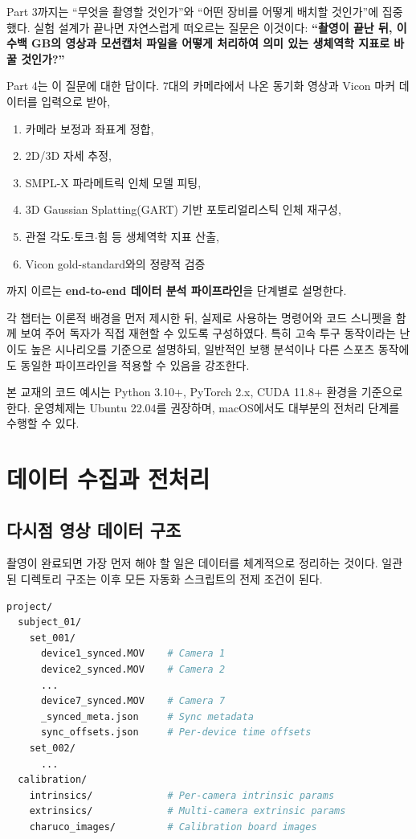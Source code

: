 \documentclass[11pt, a4paper]{report}
\begin{document}
Part 3까지는 ``무엇을 촬영할 것인가''와 ``어떤 장비를 어떻게 배치할 것인가''에 집중했다.
실험 설계가 끝나면 자연스럽게 떠오르는 질문은 이것이다:
\textbf{``촬영이 끝난 뒤, 이 수백 GB의 영상과 모션캡처 파일을 어떻게 처리하여 의미 있는 생체역학 지표로 바꿀 것인가?''}

Part 4는 이 질문에 대한 답이다. 7대의 카메라에서 나온 동기화 영상과 Vicon 마커 데이터를 입력으로 받아,
\begin{enumerate}[nosep]
  \item 카메라 보정과 좌표계 정합,
  \item 2D/3D 자세 추정,
  \item SMPL-X 파라메트릭 인체 모델 피팅,
  \item 3D Gaussian Splatting(GART) 기반 포토리얼리스틱 인체 재구성,
  \item 관절 각도$\cdot$토크$\cdot$힘 등 생체역학 지표 산출,
  \item Vicon gold-standard와의 정량적 검증
\end{enumerate}
까지 이르는 \textbf{end-to-end 데이터 분석 파이프라인}을 단계별로 설명한다.

각 챕터는 이론적 배경을 먼저 제시한 뒤, 실제로 사용하는 명령어와 코드 스니펫을 함께 보여 주어
독자가 직접 재현할 수 있도록 구성하였다. 특히 고속 투구 동작이라는 난이도 높은 시나리오를 기준으로 설명하되,
일반적인 보행 분석이나 다른 스포츠 동작에도 동일한 파이프라인을 적용할 수 있음을 강조한다.

\begin{importantnote}
본 교재의 코드 예시는 Python 3.10+, PyTorch 2.x, CUDA 11.8+ 환경을 기준으로 한다.
운영체제는 Ubuntu 22.04를 권장하며, macOS에서도 대부분의 전처리 단계를 수행할 수 있다.
\end{importantnote}

\newpage

\chapter{데이터 수집과 전처리}

\section{다시점 영상 데이터 구조}

촬영이 완료되면 가장 먼저 해야 할 일은 데이터를 체계적으로 정리하는 것이다.
일관된 디렉토리 구조는 이후 모든 자동화 스크립트의 전제 조건이 된다.

\begin{pipelinebox}[title={권장 디렉토리 레이아웃}]
\begin{lstlisting}[language=bash, numbers=none]
project/
  subject_01/
    set_001/
      device1_synced.MOV    # Camera 1
      device2_synced.MOV    # Camera 2
      ...
      device7_synced.MOV    # Camera 7
      _synced_meta.json     # Sync metadata
      sync_offsets.json     # Per-device time offsets
    set_002/
      ...
  calibration/
    intrinsics/             # Per-camera intrinsic params
    extrinsics/             # Multi-camera extrinsic params
    charuco_images/         # Calibration board images
\end{lstlisting}
\end{pipelinebox}
\end{document}
